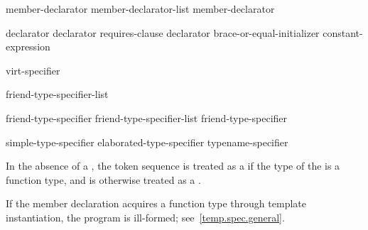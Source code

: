 \begin{bnf}
\br
    member-declarator\br
    member-declarator-list \terminal{,} member-declarator
\end{bnf}

\begin{bnf}
\br
    declarator   \br
    declarator requires-clause \br
    declarator brace-or-equal-initializer\br
      \terminal{:} constant-expression 
\end{bnf}

\begin{bnf}
\br
    virt-specifier 
\end{bnf}

\begin{bnf}
\br
    \br
\end{bnf}

\begin{bnf}
\br
    \terminal{=} 
\end{bnf}

\begin{bnf}
\br
     friend-type-specifier-list \terminal{;}
\end{bnf}

\begin{bnf}
\br
    friend-type-specifier \br
    friend-type-specifier-list \terminal{,} friend-type-specifier 
\end{bnf}

\begin{bnf}
\br
    simple-type-specifier\br
    elaborated-type-specifier\br
    typename-specifier
\end{bnf}

\pnum
In the absence of a ,
the token sequence  is treated as a 
if the type of the 
is a function type, and
is otherwise treated as a .
\begin{note}
If the member declaration acquires a function type through
template instantiation,
the program is ill-formed; see~\ref{temp.spec.general}.
\end{note}

